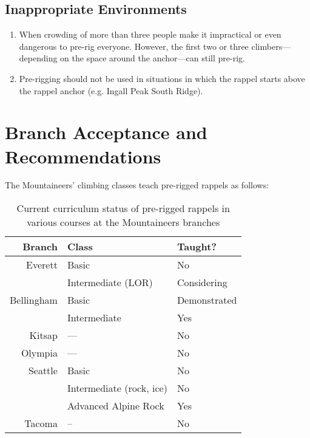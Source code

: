 \documentclass[nonacm,acmtog]{acmart}
\begin{document}
\subsection{Inappropriate Environments}

  \begin{enumerate}
  \item When crowding of more than three people make it impractical or even
    dangerous to pre-rig everyone.  However, the first two or three
    climbers---depending on the space around the anchor---can still pre-rig.
  \item Pre-rigging should not be used in situations in which the rappel starts
    above the rappel anchor (e.g. Ingall Peak South Ridge).
  \end{enumerate}

\section{Branch Acceptance and Recommendations}

  The Mountaineers' climbing classes teach pre-rigged rappels as follows:

  \begin{table}
  \begin{tabular}{|rll|}
    \hline
    \textbf{Branch} & \textbf{Class} & \textbf{Taught?} \\
    \hline\hline
    Everett    & Basic & No \\
               & Intermediate (LOR) & Considering \\
    \hline
    Bellingham & Basic & Demonstrated \\
               & Intermediate & Yes \\
    \hline
    Kitsap & --- & No \\
    \hline
    Olympia & --- & No \\
    \hline
    Seattle & Basic & No \\
            & Intermediate (rock, ice) & No \\
            & Advanced Alpine Rock     & Yes \\
    \hline
    Tacoma  & --  & No \\
    \hline
  \end{tabular}
  \caption{Current curriculum status of pre-rigged rappels in various courses
  at the Mountaineers branches}
  \end{table}
\end{document}
